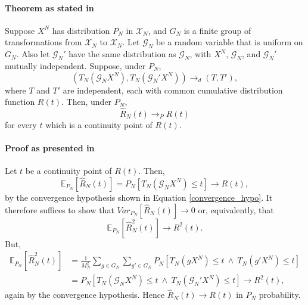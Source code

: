 \documentclass[12pt, a4paper]{article}
\theoremstyle{MAstyle} \newtheorem{assumption}{Assumption}[section]
\theoremstyle{MAstyle} \newtheorem{definition}{Definition}[section]
\theoremstyle{MAstyle} \newtheorem{theorem}{Theorem}[section]
\begin{document}
			\paragraph{Theorem as stated in \cite{lehmann_testing_2005} \\}
			Suppose $X^N$ has distribution $P_N$ in $\mathcal{X}_N$, and $G_N$ is a finite group of transformations from $\mathcal{X}_N$ to $\mathcal{X}_N$. Let $\mathcal{G}_N$ be a random variable that is uniform on $G_N$. Also let $\mathcal{G}_N'$ have the same distribution as $\mathcal{G}_N$, with $X^N$, $\mathcal{G}_N$, and $\mathcal{G}_N'$ mutually independent. Suppose, under $P_N$,
			\begin{equation}\label{convergence_hypo}
				\left(T_N(\mathcal{G}_N X^N), T_N(\mathcal{G}_N' X^N)\right) \rightarrow_d (T, T'),
			\end{equation}
			where $T$ and $T'$ are independent, each with common cumulative distribution function $R(t)$. Then, under $P_N$,
			\begin{equation}
				\hat{R}_N(t) \rightarrow_P R(t)
			\end{equation}
			for every $t$ which is a continuity point of $R(t)$.
		
			\paragraph{Proof as presented in \cite{lehmann_testing_2005}\\}
			Let $t$ be a continuity point of $R(t)$. Then, 
			\begin{equation}
				\mathbb{E}_{P_N}\left[\hat{R}_N(t)\right] = P_N\left[T_N(\mathcal{G}_NX^N) \leq t\right] \rightarrow R(t),
			\end{equation}
			by the convergence hypothesis shown in Equation \ref{convergence_hypo}. It therefore suffices to show that $\textit{Var}_{P_N}\left[\hat{R}_N(t)\right] \rightarrow 0$ or, equivalently, that
			\begin{equation}
				\mathbb{E}_{P_N}\left[\hat{R}_N^2(t)\right] \rightarrow R^2(t).
			\end{equation}
			But, 
			\begin{equation}
				\begin{split}
					\mathbb{E}_{P_N}\left[\hat{R}_N^2(t)\right] &= \frac{1}{M_N^2}\sum_{g \in G_N}\sum_{g' \in G_N} P_N\left[T_N(gX^N) \leq t \ \land \ T_N(g'X^N) \leq t\right] \\
					&= P_N\left[T_N(\mathcal{G}_NX^N) \leq t \ \land \ T_N(\mathcal{G}_N'X^N) \leq t\right] \rightarrow R^2(t),
				\end{split}
			\end{equation}
			again by the convergence hypothesis. Hence $\hat{R}_N(t) \rightarrow R(t)$ in $P_N$ probability.
			
\end{document}
